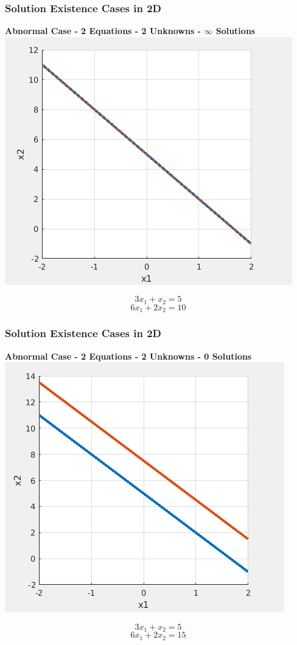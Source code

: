 \documentclass[fleqn]{beamer} %
\newcommand{\sectiontitleIII}{Solution Existence Cases in 2D}
\begin{document}
\begin{frame}\small  
  \frametitle{\sectiontitleIII}
{\bf Abnormal Case - 2 Equations - 2 Unknowns - $\infty$ Solutions}  \\ \vspace{2mm}
\includegraphics[scale=.3]{lecture5_fig2.png} \\
\begin{fleqn}
\[3x_1+x_2=5\]
\[6x_1+2x_2=10\]
\end{fleqn}
\end{frame}

\begin{frame}\small
  \frametitle{\sectiontitleIII}
{\bf Abnormal Case - 2 Equations - 2 Unknowns - 0 Solutions} \\ \vspace{2mm}
 \includegraphics[scale=.3]{lecture5_fig3.png} \\
\begin{fleqn}
\[3x_1+x_2=5\]
\[6x_1+2x_2=15\]
\end{fleqn}
\end{frame}
\end{document}
